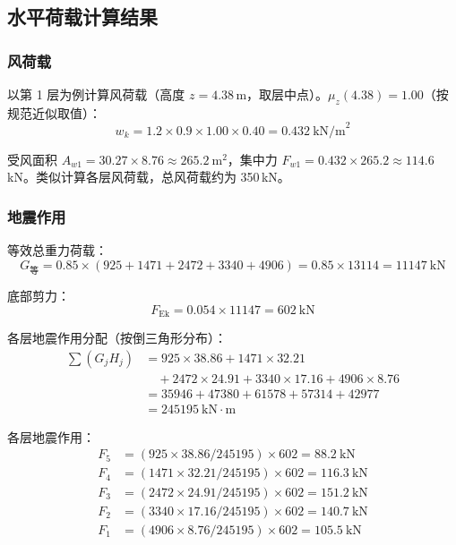 \documentclass[12pt,a4paper,UTF8]{ctexart}
\begin{document}
\subsection{水平荷载计算结果}

\subsubsection{风荷载}

以第 1 层为例计算风荷载（高度 $z = 4.38$\,m，取层中点）。$\mu_z(4.38) = 1.00$（按规范近似取值）：
\[
    w_k = 1.2 \times 0.9 \times 1.00 \times 0.40 = 0.432\ \text{kN/m}^2
\]

受风面积 $A_{w1} = 30.27 \times 8.76 \approx 265.2\ \text{m}^2$，集中力 $F_{w1} = 0.432 \times 265.2 \approx 114.6$\,kN。类似计算各层风荷载，总风荷载约为 350\,kN。

\subsubsection{地震作用}

等效总重力荷载：
\[
    G_{\text{等}} = 0.85 \times (925 + 1471 + 2472 + 3340 + 4906) = 0.85 \times 13114 = 11147\ \text{kN}
\]

底部剪力：
\[
    F_{\text{Ek}} = 0.054 \times 11147 = 602\ \text{kN}
\]

各层地震作用分配（按倒三角形分布）：
\[
    \begin{aligned}
        \sum(G_j H_j) & = 925 \times 38.86 + 1471 \times 32.21                           \\
                      & \quad + 2472 \times 24.91 + 3340 \times 17.16 + 4906 \times 8.76 \\
                      & = 35946 + 47380 + 61578 + 57314 + 42977                          \\
                      & = 245195\ \text{kN}\cdot\text{m}
    \end{aligned}
\]

各层地震作用：
\begin{align*}
    F_5 & = (925 \times 38.86 / 245195) \times 602 = 88.2\ \text{kN}   \\
    F_4 & = (1471 \times 32.21 / 245195) \times 602 = 116.3\ \text{kN} \\
    F_3 & = (2472 \times 24.91 / 245195) \times 602 = 151.2\ \text{kN} \\
    F_2 & = (3340 \times 17.16 / 245195) \times 602 = 140.7\ \text{kN} \\
    F_1 & = (4906 \times 8.76 / 245195) \times 602 = 105.5\ \text{kN}
\end{align*}
\end{document}
